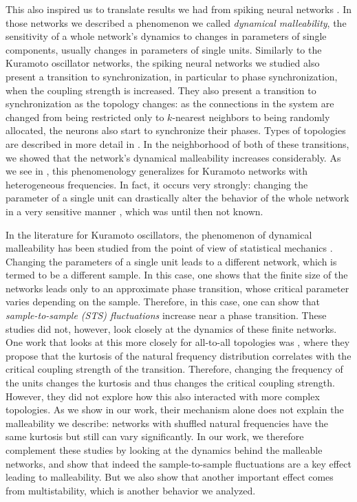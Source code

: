 This also inspired us to translate results we had from spiking neural networks \cite{budzinski2020synchronization}. In those networks we described a phenomenon we called \textit{dynamical malleability}, the sensitivity of a whole network's dynamics to changes in parameters of single components, usually changes in parameters of single units. Similarly to the Kuramoto oscillator networks, the spiking neural networks we studied also present a transition to synchronization, in particular to phase synchronization, when the coupling strength is increased. They also present a transition to synchronization as the topology changes: as the connections in the system are changed from being restricted only to $k$-nearest neighbors to being randomly allocated, the neurons also start to synchronize their phases. Types of topologies are described in more detail in . In the neighborhood of both of these transitions, we showed that the network's dynamical malleability increases considerably. As we see in , this phenomenology generalizes for Kuramoto networks with heterogeneous frequencies. In fact, it occurs very strongly: changing the parameter of a single unit can drastically alter the behavior of the whole network in a very sensitive manner \cite{rossi2022shifts}, which was until then not known. 

In the literature for Kuramoto oscillators, the phenomenon of dynamical malleability has been studied from the point of view of statistical mechanics \cite{hong2007entrainment, hong2007finitesizescalingpre}. Changing the parameters of a single unit leads to a different network, which is termed to be a different sample. In this case, one shows that the finite size of the networks leads only to an approximate phase transition, whose critical parameter varies depending on the sample. Therefore, in this case, one can show that \textit{sample-to-sample (STS) fluctuations} increase near a phase transition. These studies did not, however, look closely at the dynamics of these finite networks. One work that looks at this more closely for all-to-all topologies was , where they propose that the kurtosis of the natural frequency distribution correlates with the critical coupling strength of the transition. Therefore, changing the frequency of the units changes the kurtosis and thus changes the critical coupling strength. However, they did not explore how this also interacted with more complex topologies. As we show in our work, their mechanism alone does not explain the malleability we describe: networks with shuffled natural frequencies have the same kurtosis but still can vary significantly. In our work, we therefore complement these studies by looking at the dynamics behind the malleable networks, and show that indeed the sample-to-sample fluctuations are a key effect leading to malleability. But we also show that another important effect comes from multistability, which is another behavior we analyzed. 

